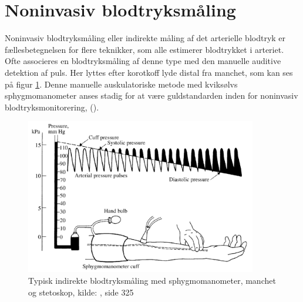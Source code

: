 \section{Noninvasiv blodtryksmåling}\label{noninvasivBloodpressureMeasurement}
Noninvasiv blodtryksmåling eller indirekte måling af det arterielle blodtryk er fællesbetegnelsen for flere teknikker, som alle estimerer blodtrykket i arteriet. Ofte associeres en blodtryksmåling af denne type med den manuelle auditive detektion af puls. Her lyttes efter korotkoff lyde distal fra manchet, som kan ses på figur \ref{fig:audiotoryBloodpressureMeasurement}. Denne manuelle auskulatoriske metode med kviksølvs sphygmomanometer anses stadig for at være guldstandarden inden for noninvasiv blodtryksmonitorering, (\cite{RefWorks:24}).

\begin{figure}[H]
	\centering
	\includegraphics[width=0.9\textwidth]{billeder/TypicalIndirectBlood-pressureMeasurement.png}
	\caption{Typisk indirekte blodtryksmåling med sphygmomanometer, manchet og stetoskop, kilde: \cite{RefWorks:27}, side 325}\label{fig:audiotoryBloodpressureMeasurement}
\end{figure}

